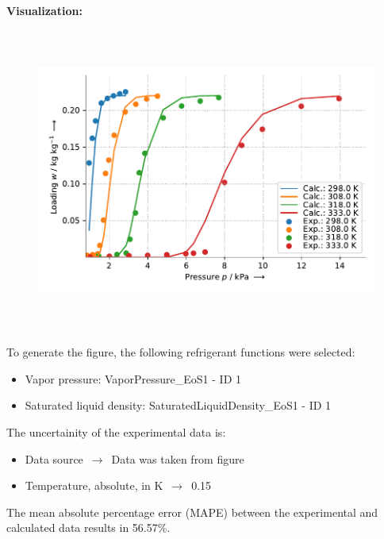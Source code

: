 \textbf{Visualization:}
%
\begin{figure}[!htp]
{\noindent\includegraphics[height=10cm, keepaspectratio]{figs/ads/ads_Water_zeotype_pellet_AQSOA-Z05_DubininAstakhov_1.pdf}}
\end{figure}
%

To generate the figure, the following refrigerant functions were selected:
\begin{itemize}
\item Vapor pressure: VaporPressure\_EoS1 - ID 1
\item Saturated liquid density: SaturatedLiquidDensity\_EoS1 - ID 1
\end{itemize}

The uncertainity of the experimental data is:
\begin{itemize}
\item Data source $\,\to\,$ Data was taken from figure
\item Temperature, absolute, in $\si{\kelvin}$ $\,\to\,$ 0.15
\end{itemize}

The mean absolute percentage error (MAPE) between the experimental and calculated data results in 56.57\%.
\FloatBarrier
\newpage
